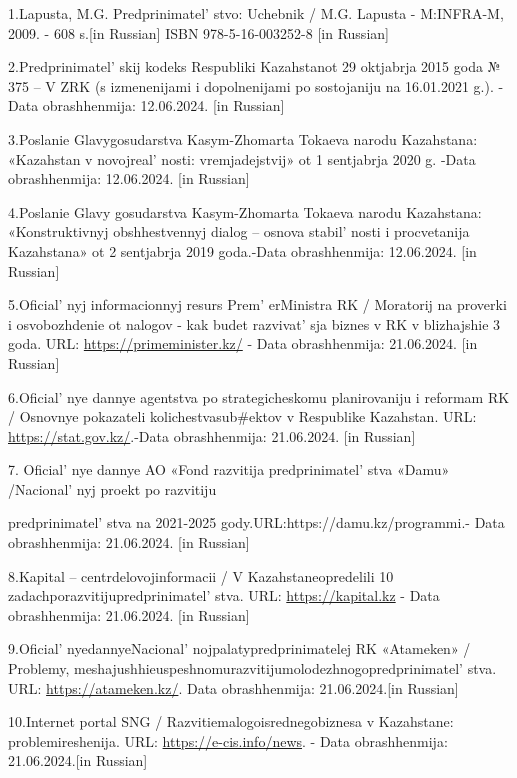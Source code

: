 \begin{references}
1.Lapusta, M.G. Predprinimatel' stvo: Uchebnik / M.G.
Lapusta - M:INFRA-M, 2009. - 608 s.{[}in Russian{]} ISBN
978-5-16-003252-8 {[}in Russian{]}

2.Predprinimatel' skij kodeks Respubliki Kazahstanot 29
oktjabrja 2015 goda № 375 -- V ZRK (s izmenenijami i dopolnenijami po
sostojaniju na 16.01.2021 g.). -Data obrashhenmija: 12.06.2024. {[}in
Russian{]}

3.Poslanie Glavygosudarstva Kasym-Zhomarta Tokaeva narodu Kazahstana:
«Kazahstan v novojreal' nosti: vremjadejstvij» ot 1
sentjabrja 2020 g. -Data obrashhenmija: 12.06.2024. {[}in Russian{]}

4.Poslanie Glavy gosudarstva Kasym-Zhomarta Tokaeva narodu Kazahstana:
«Konstruktivnyj obshhestvennyj dialog -- osnova
stabil' nosti i procvetanija Kazahstana» ot 2 sentjabrja
2019 goda.-Data obrashhenmija: 12.06.2024. {[}in Russian{]}

5.Oficial' nyj informacionnyj resurs
Prem' erMinistra RK / Moratorij na proverki i
osvobozhdenie ot nalogov - kak budet razvivat' sja biznes
v RK v blizhajshie 3 goda. URL: \url{https://primeminister.kz/} - Data
obrashhenmija: 21.06.2024. {[}in Russian{]}

6.Oficial' nye dannye agentstva po strategicheskomu
planirovaniju i reformam RK / Osnovnye pokazateli kolichestvasub\#ektov
v Respublike Kazahstan. URL: \url{https://stat.gov.kz/}.-Data
obrashhenmija: 21.06.2024. {[}in Russian{]}

7. Oficial' nye dannye AO «Fond razvitija
predprinimatel' stva «Damu» /Nacional' nyj
proekt po razvitiju

predprinimatel' stva na 2021-2025
gody.URL:https://damu.kz/programmi.- Data obrashhenmija: 21.06.2024.
{[}in Russian{]}

8.Kapital -- centrdelovojinformacii / V Kazahstaneopredelili 10
zadachporazvitijupredprinimatel' stva. URL:
\url{https://kapital.kz} - Data obrashhenmija: 21.06.2024. {[}in
Russian{]}

9.Oficial' nyedannyeNacional' nojpalatypredprinimatelej
RK «Atameken» / Problemy,
meshajushhieuspeshnomurazvitijumolodezhnogopredprinimatel' stva.
URL: \url{https://atameken.kz/}. Data obrashhenmija: 21.06.2024.{[}in
Russian{]}

10.Internet portal SNG / Razvitiemalogoisrednegobiznesa v Kazahstane:
problemireshenija. URL: \url{https://e-cis.info/news}. - Data
obrashhenmija: 21.06.2024.{[}in Russian{]}
\end{references}


